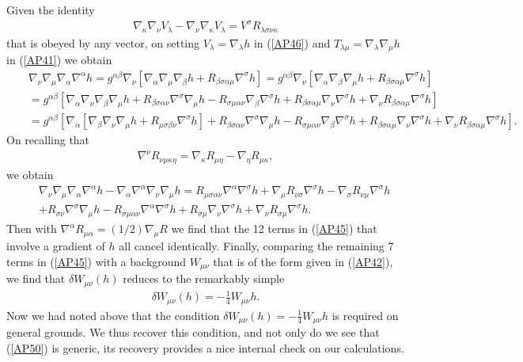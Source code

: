 \documentclass[aps]{revtex4}
\begin{document}
Given the identity 
%
\begin{eqnarray}
\nabla_{\kappa}\nabla_{\nu}V_{\lambda}-\nabla_{\nu}\nabla_{\kappa}V_{\lambda}=V^{\sigma}R_{\lambda\sigma\nu\kappa}
\label{AP46}
\end{eqnarray}
%
that is obeyed by any vector, on setting $V_{\lambda}=\nabla_{\lambda}h$ in (\ref{AP46})  and $T_{\lambda\mu}=\nabla_{\lambda}\nabla_{\mu}h$ in (\ref{AP41}) we obtain
%
\begin{eqnarray}
&&\nabla_{\nu}\nabla_{\mu}\nabla_{\alpha}\nabla^{\alpha}h
=g^{\alpha\beta}\nabla_{\nu}[\nabla_{\alpha}\nabla_{\mu}\nabla_{\beta}h
+R_{\beta\sigma\alpha\mu}\nabla^{\sigma}h]
=g^{\alpha\beta}\nabla_{\nu}[\nabla_{\alpha}\nabla_{\beta}\nabla_{\mu}h
+R_{\beta\sigma\alpha\mu}\nabla^{\sigma}h]
\nonumber\\
&&=g^{\alpha\beta}[\nabla_{\alpha}\nabla_{\nu}\nabla_{\beta}\nabla_{\mu}h
+R_{\beta\sigma\alpha\nu}\nabla^{\sigma}\nabla_{\mu}h
-R_{\sigma\mu\alpha\nu}\nabla_{\beta}\nabla^{\sigma}h
+R_{\beta\sigma\alpha\mu}\nabla_{\nu}\nabla^{\sigma}h
+\nabla_{\nu}R_{\beta\sigma\alpha\mu}\nabla^{\sigma}h]
\nonumber\\
&&=g^{\alpha\beta}[\nabla_{\alpha}[\nabla_{\beta}\nabla_{\nu}\nabla_{\mu}h
+R_{\mu\sigma\beta\nu}\nabla^{\sigma}h]
+R_{\beta\sigma\alpha\nu}\nabla^{\sigma}\nabla_{\mu}h
-R_{\sigma\mu\alpha\nu}\nabla_{\beta}\nabla^{\sigma}h
+R_{\beta\sigma\alpha\mu}\nabla_{\nu}\nabla^{\sigma}h
+\nabla_{\nu}R_{\beta\sigma\alpha\mu}\nabla^{\sigma}h].
\label{AP47}
\end{eqnarray}
%
On recalling that 
%
\begin{eqnarray}
 \nabla^{\nu}R_{\nu\mu\kappa\eta}=\nabla_{\kappa}R_{\mu\eta}-\nabla_{\eta}R_{\mu\kappa},
\label{AP48}
\end{eqnarray}
%
we obtain
%
\begin{eqnarray}
&&\nabla_{\nu}\nabla_{\mu}\nabla_{\alpha}\nabla^{\alpha}h-\nabla_{\alpha}\nabla^{\alpha}\nabla_{\nu}\nabla_{\mu}h
=R_{\mu\sigma\alpha\nu}\nabla^{\alpha}\nabla^{\sigma}h
+\nabla_{\mu}R_{\nu\sigma}\nabla^{\sigma}h
-\nabla_{\sigma}R_{\nu\mu}
\nabla^{\sigma}h\nonumber\\
&&+R_{\sigma\nu}\nabla^{\sigma}\nabla_{\mu}h
-R_{\sigma\mu\alpha\nu}\nabla^{\alpha}\nabla^{\sigma}h
+R_{\sigma\mu}\nabla_{\nu}\nabla^{\sigma}h
+\nabla_{\nu}R_{\sigma\mu}\nabla^{\sigma}h.
\label{AP49}
\end{eqnarray}
%
Then with $\nabla^{\alpha}R_{\mu\alpha}=(1/2)\nabla _{\mu}R$ we find that the 12 terms in (\ref{AP45}) that involve a gradient of $h$ all cancel identically. Finally, comparing the remaining 7 terms in (\ref{AP45}) with a background $W_{\mu\nu}$ that is of the form given in (\ref{AP42}), we find that $\delta W_{\mu\nu}(h)$ reduces to the remarkably simple
%
\begin{eqnarray}
\delta W_{\mu\nu}(h)=-\frac{1}{4}W_{\mu\nu}h.
\label{AP50}
\end{eqnarray}
%
Now we had noted above that  the condition $\delta W_{\mu\nu}(h)=-\frac{1}{4}W_{\mu\nu}h$ is required on general grounds. We thus recover this condition, and not only do we see that (\ref{AP50}) is generic, its recovery provides a nice internal  check on our calculations. 
\end{document}

